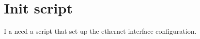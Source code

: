 \documentclass{article}
\begin{document}
\section{Init script}
I a need a script that set up the ethernet interface configuration.
\end{document}
